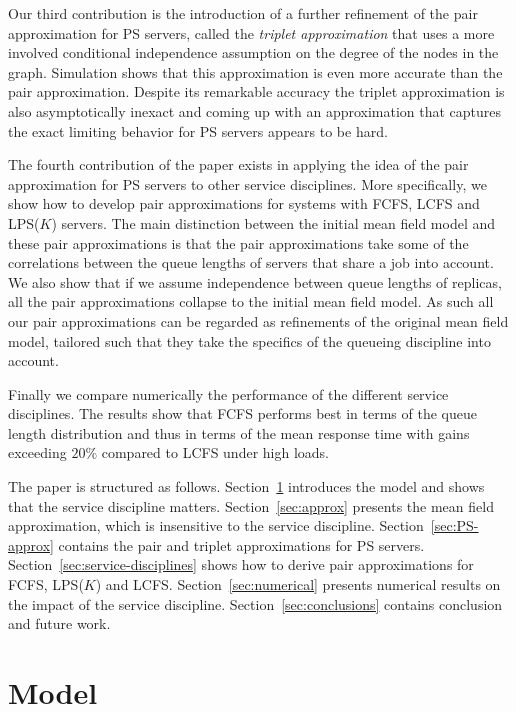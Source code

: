 \documentclass[acmsmall,nonacm]{acmart}
\begin{document}
Our third contribution is the introduction of  a
further refinement of the pair approximation for PS servers, called the {\it triplet approximation} that uses a more involved conditional
independence assumption on the degree of the  nodes in the graph. Simulation shows that
this approximation is even more accurate than the pair approximation. Despite its remarkable
accuracy the triplet approximation is also asymptotically inexact and coming up with an approximation
that captures the exact limiting behavior for PS servers appears to be hard.

The fourth contribution of the paper exists in applying the idea of the pair approximation
for PS servers to other service disciplines. More specifically, we show how to develop
pair approximations for systems with FCFS, LCFS and LPS($K$) servers.
The main distinction between the initial mean field model and these pair approximations is
that the pair approximations take some of the correlations between the queue lengths of servers that share a job into account. We also show that if we assume independence between queue lengths of replicas, all the pair 
approximations collapse to the initial mean field model.
As such all our pair approximations can be regarded as refinements of the original mean
field model, tailored such that they take the specifics of the queueing discipline into account.

Finally we compare numerically the performance of the different service disciplines. The results show that FCFS performs best in terms of the queue length
distribution and thus in terms of the mean response time with gains exceeding
$20\%$ compared to LCFS under high loads.

The paper is structured as follows. Section~\ref{sec:model} introduces the model and shows that
the service discipline matters. Section~\ref{sec:approx} presents the mean field approximation, which is insensitive to the service discipline.
Section~\ref{sec:PS-approx} contains the pair and triplet approximations for PS servers. Section~\ref{sec:service-disciplines} shows how to derive pair approximations for FCFS, LPS($K$) and LCFS. Section~\ref{sec:numerical} presents numerical results on the impact of the service discipline.
Section~\ref{sec:conclusions} contains conclusion and future work. 


\section{Model}
\label{sec:model}
\end{document}
